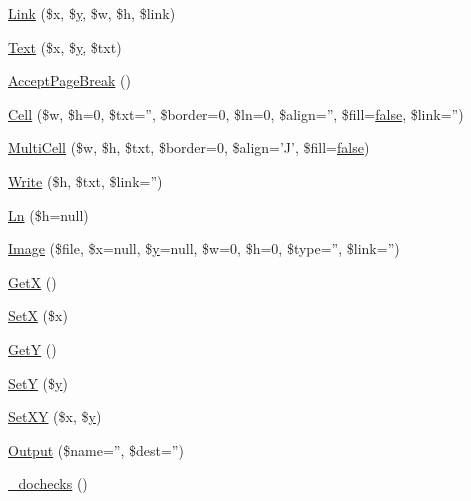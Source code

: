 \begin{DoxyCompactItemize}
\hyperlink{class_f_p_d_f_a50de51eae9ed1dab3a448491fcbbdde5}{Link} (\$x, \$\hyperlink{example43___m_p_d_f_i__booklet_8php_a3f83be162d14f38451e1bc419fbbbcbc}{y}, \$w, \$h, \$link)
\item 
\hyperlink{class_f_p_d_f_af3354d9f93d576837fba5b157a1a7e37}{Text} (\$x, \$\hyperlink{example43___m_p_d_f_i__booklet_8php_a3f83be162d14f38451e1bc419fbbbcbc}{y}, \$txt)
\item 
\hyperlink{class_f_p_d_f_acb406647f47041ae06ec01324e6a2377}{Accept\-Page\-Break} ()
\item 
\hyperlink{class_f_p_d_f_a37c88a6a7daf937b3dd88a903ccbfa64}{Cell} (\$w, \$h=0, \$txt='', \$border=0, \$ln=0, \$align='', \$fill=\hyperlink{ttfontsuni_8php_afbaa04e5cc97693dc668b3c45d3dd740}{false}, \$link='')
\item 
\hyperlink{class_f_p_d_f_aaa047bd8692257bb2962d5d65c090319}{Multi\-Cell} (\$w, \$h, \$txt, \$border=0, \$align='J', \$fill=\hyperlink{ttfontsuni_8php_afbaa04e5cc97693dc668b3c45d3dd740}{false})
\item 
\hyperlink{class_f_p_d_f_a75beddaabec9e3d2b8939bd46f99e615}{Write} (\$h, \$txt, \$link='')
\item 
\hyperlink{class_f_p_d_f_a445e0364c7fa330c415495bb31f5651c}{Ln} (\$h=null)
\item 
\hyperlink{class_f_p_d_f_a680c80cc244b5636db22994cf1b27a68}{Image} (\$file, \$x=null, \$\hyperlink{example43___m_p_d_f_i__booklet_8php_a3f83be162d14f38451e1bc419fbbbcbc}{y}=null, \$w=0, \$h=0, \$type='', \$link='')
\item 
\hyperlink{class_f_p_d_f_a8b7bbc6309142f76ec2a78815f2f700f}{Get\-X} ()
\item 
\hyperlink{class_f_p_d_f_a2bfd055c0ed78a7929fa17ba64f9cf65}{Set\-X} (\$x)
\item 
\hyperlink{class_f_p_d_f_a7a0b514eaa73283268ac14e9f0d7f0c4}{Get\-Y} ()
\item 
\hyperlink{class_f_p_d_f_a7a0e004fce75cd2cd3501cf54be632e4}{Set\-Y} (\$\hyperlink{example43___m_p_d_f_i__booklet_8php_a3f83be162d14f38451e1bc419fbbbcbc}{y})
\item 
\hyperlink{class_f_p_d_f_a2c191daee30b7ea3a66696bd0be92a3e}{Set\-X\-Y} (\$x, \$\hyperlink{example43___m_p_d_f_i__booklet_8php_a3f83be162d14f38451e1bc419fbbbcbc}{y})
\item 
\hyperlink{class_f_p_d_f_ac4e0bfb71d9e602637c67016e4b5dd40}{Output} (\$name='', \$dest='')
\item 
\hyperlink{class_f_p_d_f_a1ce404a00709a07ca9851b91aefbb0c4}{\-\_\-dochecks} ()
\item 

\end{DoxyCompactItemize}
